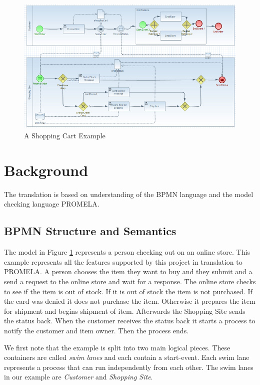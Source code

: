 \documentclass[11pt,twocolumn]{article}
\begin{document}
\begin{figure}
  \includegraphics{shoppingFlow}
  \caption{A Shopping Cart Example}
  \label{fig:shoppingFlow}
\end{figure}

\section{Background}\label{sec:background}
The translation is based on understanding of the BPMN language and the model checking language PROMELA.

\subsection{BPMN Structure and Semantics}

The model in Figure \ref{fig:shoppingFlow} represents a person checking out on an online store. This example represents all the features supported by this project in translation to PROMELA. A person chooses the item they want to buy and they submit and a send a request to the online store and wait for a response. The online store checks to see if the item is out of stock. If it is out of stock the item is not purchased. If the card was denied it does not purchase the item. Otherwise it prepares the item for shipment and begins shipment of item. Afterwards the Shopping Site sends the status back. When the customer receives the status back it starts a process to notify the customer and item owner. Then the process ends.

We first note that the example is split into two main logical pieces. These containers are called \emph{swim lanes} and each contain a start-event. Each swim lane represents a process that can run independently from each other. The swim lanes in our example are \emph{Customer} and \emph{Shopping Site}.
\end{document}
